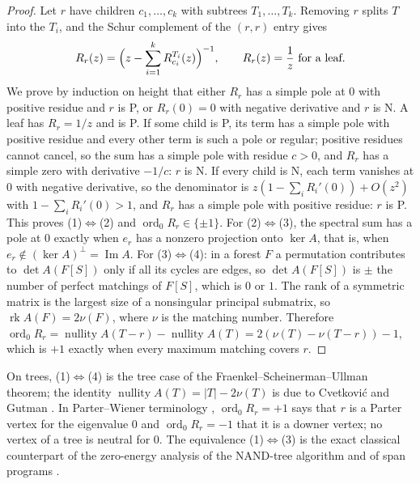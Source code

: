 \documentclass[final]{siamart0516}
\numberwithin{theorem}{section}
\numberwithin{equation}{section}
\theoremstyle{siamnonum}
\theoremstyle{plain}
\newcommand{\ord}{\operatorname{ord}}
\newcommand{\rk}{\operatorname{rk}}
\begin{document}
\begin{proof}
Let $r$ have children $c_1,\dots,c_k$ with subtrees $T_1,\dots,T_k$. Removing $r$ splits $T$ into the $T_i$, and the Schur complement of the $(r,r)$ entry gives
\begin{equation}\label{eq:schur}
R_r(z)=\Bigl(z-\sum_{i=1}^kR^{T_i}_{c_i}(z)\Bigr)^{-1},\qquad R_r(z)=\frac1z\ \text{for a leaf.}
\end{equation}
We prove by induction on height that either $R_r$ has a simple pole at $0$ with positive residue and $r$ is P, or $R_r(0)=0$ with negative derivative and $r$ is N. A leaf has $R_r=1/z$ and is P. If some child is P, its term has a simple pole with positive residue and every other term is such a pole or regular; positive residues cannot cancel, so the sum has a simple pole with residue $c>0$, and $R_r$ has a simple zero with derivative $-1/c$: $r$ is N. If every child is N, each term vanishes at $0$ with negative derivative, so the denominator is $z(1-\sum_iR_i'(0))+O(z^2)$ with $1-\sum_iR_i'(0)>1$, and $R_r$ has a simple pole with positive residue: $r$ is P. This proves (1)$\Leftrightarrow$(2) and $\ord_0R_r\in\{\pm1\}$.
For (2)$\Leftrightarrow$(3), the spectral sum has a pole at $0$ exactly when $e_r$ has a nonzero projection onto $\ker A$, that is, when $e_r\notin(\ker A)^{\perp}=\operatorname{Im}A$. For (3)$\Leftrightarrow$(4): in a forest $F$ a permutation contributes to $\det A(F[S])$ only if all its cycles are edges, so $\det A(F[S])$ is $\pm$ the number of perfect matchings of $F[S]$, which is $0$ or $1$. The rank of a symmetric matrix is the largest size of a nonsingular principal submatrix, so $\rk A(F)=2\nu(F)$, where $\nu$ is the matching number. Therefore $\ord_0R_r=\operatorname{nullity}A(T-r)-\operatorname{nullity}A(T)=2(\nu(T)-\nu(T-r))-1$, which is $+1$ exactly when every maximum matching covers $r$.
\end{proof}

On trees, (1)$\Leftrightarrow$(4) is the tree case of the Fraenkel--Scheinerman--Ullman theorem; the identity $\operatorname{nullity}A(T)=|T|-2\nu(T)$ is due to Cvetkovi\'c and Gutman \cite{CvetkovicGutman}. In Parter--Wiener terminology \cite{JLS}, $\ord_0R_r=+1$ says that $r$ is a Parter vertex for the eigenvalue $0$ and $\ord_0R_r=-1$ that it is a downer vertex; no vertex of a tree is neutral for $0$. The equivalence (1)$\Leftrightarrow$(3) is the exact classical counterpart of the zero-energy analysis of the NAND-tree algorithm \cite{FGG} and of span programs \cite{ReichardtSpalek}.
\end{document}
